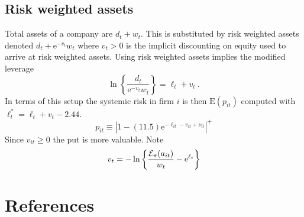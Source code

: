 \documentclass[authoryear]{elsarticle}
\newcommand{\E}{\mathrm{E}}
\newcommand{\e}{\mathrm{e}}
\newcommand{\Ex}{{\cal E}}
\begin{document}
\subsection{Risk weighted assets}

Total assets of a company are $d_{t}+w_{t}$.   This is substituted by risk weighted assets denoted $d_t+\e^{-v_t}w_t$ where $v_t>0$ is the implicit discounting on equity used to arrive at risk weighted assets.  
  Using risk weighted assets implies the modified leverage
$$
 \ln\left\{ \frac{d_t}{\e^{-v_t}w_t}\right\}=\ell_t +v_t\ .
$$
In terms of this setup the systemic risk in firm $i$ is then $\E(p_{it})$ computed with $\ell_t^*=\ell_t + v_t-2.44$.
$$
p_{it}\equiv  |1-(11.5)\e^{-\ell_{it}-v_{it}+\nu_{it}}|^+
$$
Since $v_{it}\ge 0$ the put is more valuable.   Note 
$$
v_t =-\ln\left\{ \frac{\Ex_\pi(a_{it})}{w_t} - \e^{\ell_t}\right\}
$$

\section*{References}

\end{document}
